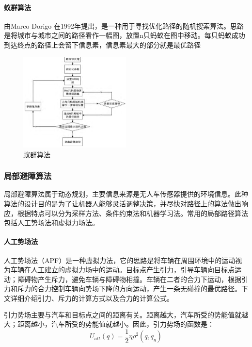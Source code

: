\documentclass{report}
\begin{document}
\paragraph{蚁群算法}

由Marco Dorigo 在1992年提出，是一种用于寻找优化路径的随机搜索算法\cite{jh5}。思路是将城市与城市之间的路径看作一幅图，放置n只蚂蚁在图中移动。每只蚂蚁成功到达终点的路径上会留下信息素，信息素最大的部分就是最优路径
\begin{figure}[ht]
  \centering
  \includegraphics[width=0.5\textwidth]{figures/yiqun.png}
  \caption{蚁群算法 }
\end{figure}

\subsubsection{局部避障算法}
\label{subsec:label}
局部避障算法属于动态规划，主要信息来源是无人车传感器提供的环境信息。此种算法的设计目的是为了让机器人能够灵活调整决策，并尽快对路径上的算法做出响应，根据特点可以分为采样方法、条件约束法和机器学习法。常用的局部路径算法包括人工势场法和虚拟力场法。
\paragraph{人工势场法\cite{jh6}}

人工势场法（APF）是一种虚拟力法，它的思路是将车辆在周围环境中的运动视为车辆在人工建立的虚拟力场中的运动。目标点产生引力，引导车辆向目标点运动；障碍物产生斥力，避免车辆与障碍物相撞。车辆在二者的合力下运动，根据引力和斥力的合力控制车辆向势场下降的方向运动，产生一条无碰撞的最优路径。下文详细介绍引力、斥力的计算方式以及合力的计算公式。

引力势场主要与汽车和目标点之间的距离有关。距离越大，汽车所受的势能值就越大；距离越小，汽车所受的势能值就越小。因此，引力势场的函数是：
$$U_{att}(q)=\frac12\eta\rho^2(q,q_g)$$
\end{document}
